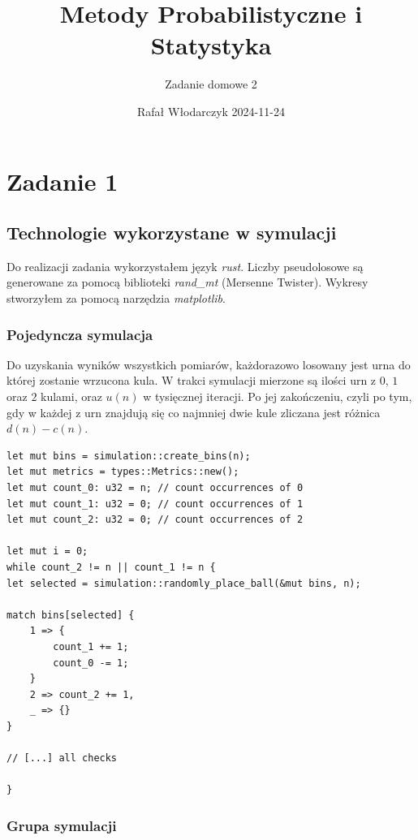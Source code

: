 \documentclass{article}
\title{Metody Probabilistyczne i Statystyka}
\author{Zadanie domowe 2}
\date{Rafał Włodarczyk 2024-11-24}
\begin{document}
\maketitle

\tableofcontents

\section{Zadanie 1}

\subsection{Technologie wykorzystane w symulacji}

Do realizacji zadania wykorzystałem język \textit{rust}. Liczby pseudolosowe są generowane za pomocą biblioteki \textit{rand\_mt} (Mersenne Twister). Wykresy stworzyłem za pomocą narzędzia \textit{matplotlib}. 

\subsubsection{Pojedyncza symulacja}

Do uzyskania wyników wszystkich pomiarów, każdorazowo losowany jest urna do której zostanie wrzucona kula. W trakci symulacji mierzone są ilości urn z $0$, $1$ oraz $2$ kulami, oraz $u(n)$ w tysięcznej iteracji. Po jej zakończeniu, czyli po tym, gdy w każdej z urn znajdują się co najmniej dwie kule zliczana jest różnica $d(n)-c(n)$.

\begin{verbatim}
let mut bins = simulation::create_bins(n);
let mut metrics = types::Metrics::new();
let mut count_0: u32 = n; // count occurrences of 0
let mut count_1: u32 = 0; // count occurrences of 1
let mut count_2: u32 = 0; // count occurrences of 2

let mut i = 0;
while count_2 != n || count_1 != n {
let selected = simulation::randomly_place_ball(&mut bins, n);

match bins[selected] {
    1 => {
        count_1 += 1;
        count_0 -= 1;
    }
    2 => count_2 += 1,
    _ => {}
}

// [...] all checks

}
\end{verbatim}

\subsubsection{Grupa symulacji}
\end{document}
